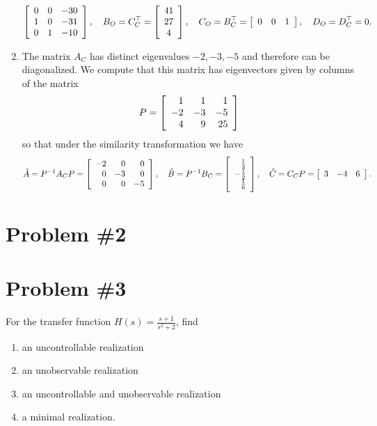 \documentclass{article}
\begin{document}
\begin{enumerate}
{$$    \left[\begin{array}{r r r}
      0 & 0 & -30 \\
      1 & 0 & -31 \\
      0 & 1 & -10
    \end{array}\right], \quad
    B_O = C_C^\top =
    \left[\begin{array}{c}
      41 \\
      27 \\
      4
    \end{array}\right], \quad
    C_O = B_C^\top =
    \left[\begin{array}{c c c}
      0 & 0 & 1
    \end{array}\right], \quad
    D_O = D_C^\top = 0.
    $$
  }
  \item{
    The matrix $A_C$ has distinct eigenvalues $-2, -3, -5$ and
    therefore can be diagonalized. We compute that this matrix has
    eigenvectors given by columns of the matrix
    $$
    P = \left[\begin{array}{r r r}
      1 &  1 &  1 \\
     -2 & -3 & -5 \\
      4 &  9 & 25
    \end{array}\right]
    $$
    so that under the similarity transformation we have
    $$
    \hat{A} = P^{-1} A_C P =
    \left[\begin{array}{r r r}
      -2 &  0 &  0 \\
       0 & -3 &  0 \\
       0 &  0 & -5
    \end{array}\right], \quad
    \hat{B} = P^{-1} B_C =
    \left[\begin{array}{r}
       \frac{1}{3} \\
      -\frac{1}{2} \\
       \frac{1}{6}
    \end{array}\right], \quad
    \hat{C} = C_C P =
    \left[\begin{array}{r r r}
      3 & -4 & 6
    \end{array}\right].
    $$
  }
\end{enumerate}

\pagebreak

\section*{Problem \#2}

\pagebreak

\section*{Problem \#3}
For the transfer function $H(s) = \frac{s+1}{s^2 + 2}$, find
\begin{enumerate}
  \item{
    an uncontrollable realization
  }
  \item{
    an unobservable realization
  }\item{
    an uncontrollable and unobservable realization
  }\item{
    a minimal realization.
  }
\end{enumerate}
\end{document}
